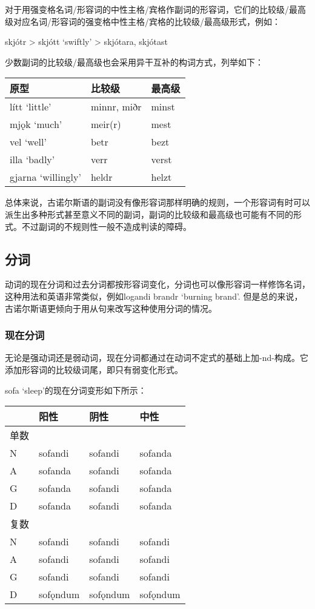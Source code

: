 对于用强变格名词/形容词的中性主格/宾格作副词的形容词，它们的比较级/最高级对应名词/形容词的强变格中性主格/宾格的比较级/最高级形式，例如：

skjótr \textgreater{} skjótt `swiftly' \textgreater{} skjótara, skjótast

少数副词的比较级/最高级也会采用异干互补的构词方式，列举如下：

\begin{longtable}{lll}
\toprule
原型 & 比较级 & 最高级 \\
\midrule
\endhead
\bottomrule
\endfoot
lítt `little‌' & minnr, miðr & minst \\
mjǫk `much‌' & meir(r) & mest \\
vel `well‌' & betr & bezt \\
illa `badly‌' & verr & verst \\
gjarna `willingly‌' & heldr & helzt \\
\end{longtable}

总体来说，古诺尔斯语的副词没有像形容词那样明确的规则，一个形容词有时可以派生出多种形式甚至意义不同的副词，副词的比较级和最高级也可能有不同的形式。不过副词的不规则性一般不造成判读的障碍。

\subsection{分词}\label{ux5206ux8bcd}

动词的现在分词和过去分词都按形容词变化，分词也可以像形容词一样修饰名词，这种用法和英语非常类似，例如logandi
brandr `burning brand‌'.
但是总的来说，古诺尔斯语更倾向于用从句来改写这种使用分词的情况。

\subsubsection{现在分词}\label{ux73b0ux5728ux5206ux8bcd}

无论是强动词还是弱动词，现在分词都通过在动词不定式的基础上加-nd-构成。它添加形容词的比较级词尾，即只有弱变化形式。

sofa `sleep‌'的现在分词变形如下所示：

\begin{longtable}{llll}
\toprule
 & 阳性 & 阴性 & 中性 \\
\midrule
\endhead
\bottomrule
\endfoot
单数 & & & \\
N & sofandi & sofandi & sofanda \\
A & sofanda & sofandi & sofanda \\
G & sofanda & sofandi & sofanda \\
D & sofanda & sofandi & sofanda \\
复数 & & & \\
N & sofandi & sofandi & sofandi \\
A & sofandi & sofandi & sofandi \\
G & sofandi & sofandi & sofandi \\
D & sofǫndum & sofǫndum & sofǫndum \\
\end{longtable}

